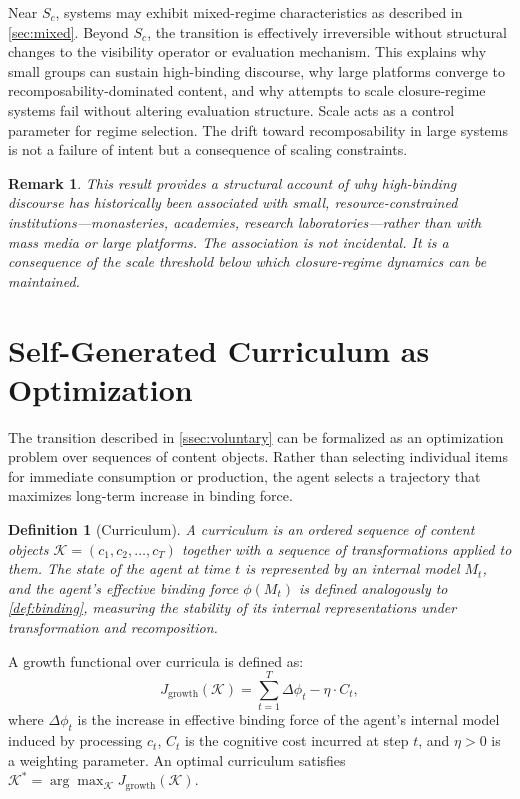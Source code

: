 \documentclass[12pt]{article}
\newtheorem{definition}{Definition}[section]
\newtheorem{remark}{Remark}[section]
\newcommand{\bind}{\phi}
\newcommand{\Jgrowth}{J_{\mathrm{growth}}}
\begin{document}
Near $S_c$, systems may exhibit mixed-regime characteristics as described
in \cref{sec:mixed}. Beyond $S_c$, the transition is effectively
irreversible without structural changes to the visibility operator or
evaluation mechanism. This explains why small groups can sustain
high-binding discourse, why large platforms converge to
recomposability-dominated content, and why attempts to scale
closure-regime systems fail without altering evaluation structure. Scale
acts as a control parameter for regime selection. The drift toward
recomposability in large systems is not a failure of intent but a
consequence of scaling constraints.

\begin{remark}
This result provides a structural account of why high-binding discourse
has historically been associated with small, resource-constrained
institutions---monasteries, academies, research laboratories---rather
than with mass media or large platforms. The association is not
incidental. It is a consequence of the scale threshold below which
closure-regime dynamics can be maintained.
\end{remark}

\section{Self-Generated Curriculum as Optimization}
\label{sec:curriculum}

The transition described in \cref{ssec:voluntary} can be formalized as
an optimization problem over sequences of content objects. Rather than
selecting individual items for immediate consumption or production, the
agent selects a trajectory that maximizes long-term increase in binding
force.

\begin{definition}[Curriculum]
\label{def:curriculum}
A \emph{curriculum} is an ordered sequence of content objects
$\mathcal{K} = (c_1, c_2, \dots, c_T)$ together with a sequence of
transformations applied to them. The state of the agent at time $t$ is
represented by an internal model $M_t$, and the agent's effective
binding force $\bind(M_t)$ is defined analogously to \cref{def:binding},
measuring the stability of its internal representations under
transformation and recomposition.
\end{definition}

A growth functional over curricula is defined as:
\[
\Jgrowth(\mathcal{K}) =
\sum_{t=1}^{T} \Delta \bind_t - \eta \cdot C_t,
\]
where $\Delta \bind_t$ is the increase in effective binding force of the
agent's internal model induced by processing $c_t$, $C_t$ is the
cognitive cost incurred at step $t$, and $\eta > 0$ is a weighting
parameter. An optimal curriculum satisfies
$\mathcal{K}^* = \arg\max_{\mathcal{K}} \Jgrowth(\mathcal{K})$.
\end{document}
